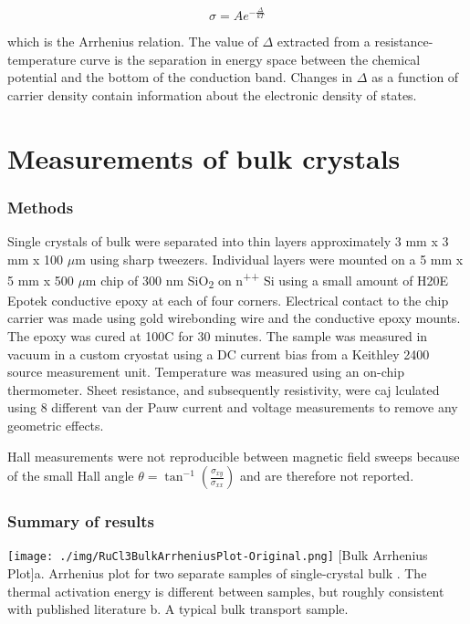 \begin{equation}
\sigma = A e^{-\frac{\Delta}{kT}}
\end{equation}

which is the Arrhenius relation. The value of $\Delta$ extracted from a resistance-temperature curve is the separation in energy space between the chemical potential and the bottom of the conduction band. Changes in $\Delta$ as a function of carrier density contain information about the electronic density of states.


\section{Measurements of \texorpdfstring{\rucl}{RuCl3}bulk crystals}

\subsubsection{Methods}
Single crystals of bulk \rucl were separated into thin layers approximately 3 mm x 3 mm x 100 $\mu$m using sharp tweezers. Individual layers were mounted on a 5 mm x 5 mm x 500 $\mu$m chip of 300 nm SiO\textsubscript{2} on n\textsuperscript{++} Si using a small amount of H20E Epotek conductive epoxy at each of four corners. Electrical contact to the chip carrier was made using gold wirebonding wire and the conductive epoxy mounts. The epoxy was cured at 100\degree C for 30 minutes. The sample was measured in vacuum in a custom cryostat using a DC current bias from a Keithley 2400 source measurement unit. Temperature was measured using an on-chip thermometer. Sheet resistance, and subsequently resistivity, were caj	lculated using 8 different van der Pauw current and voltage measurements to remove any geometric effects.

Hall measurements were not reproducible between magnetic field sweeps because of the small Hall angle $\theta = \tan^{-1} \left( \frac{\sigma_{xy}}{\sigma_{xx}} \right)$ and are therefore not reported.

\subsubsection{Summary of results}

\begin{centering}
\texttt{[image: ./img/RuCl3BulkArrheniusPlot-Original.png]}
  \captionsetup{width=0.75\textwidth}
  [Bulk \rucl Arrhenius Plot]{a. Arrhenius plot for two separate samples of single-crystal bulk \ruclnospace . The thermal activation energy is different between samples, but roughly consistent with published literature b. A typical bulk \rucl transport sample.} 
  \label{fig:ElecTransBulk-01}
\end{centering}

